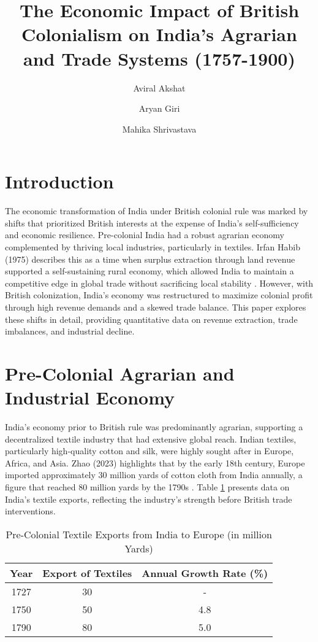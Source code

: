 \documentclass[9pt,twocolumn,twoside]{opticajnl}
\title{The Economic Impact of British Colonialism on India’s Agrarian and Trade Systems (1757-1900)}}
\author[1]{Aviral Akshat}
\author[2,]{Aryan Giri}
\author[3]{Mahika Shrivastava}
\affil[1]{2023MS11098}
\affil[2]{2023MS10602}
\affil[3]{2021ME21069}
\affil[1]{ms1231098@iitd.ac.in}
\affil[2]{ms1230602@iitd.ac.in}
\affil[3]{me2211069@iitd.ac.in}
\begin{document}
\maketitle

\section{Introduction}
The economic transformation of India under British colonial rule was marked by shifts that prioritized British interests at the expense of India’s self-sufficiency and economic resilience. Pre-colonial India had a robust agrarian economy complemented by thriving local industries, particularly in textiles. Irfan Habib (1975) describes this as a time when surplus extraction through land revenue supported a self-sustaining rural economy, which allowed India to maintain a competitive edge in global trade without sacrificing local stability \cite{habib1975colonization}. However, with British colonization, India’s economy was restructured to maximize colonial profit through high revenue demands and a skewed trade balance. This paper explores these shifts in detail, providing quantitative data on revenue extraction, trade imbalances, and industrial decline.

\section{Pre-Colonial Agrarian and Industrial Economy}
India’s economy prior to British rule was predominantly agrarian, supporting a decentralized textile industry that had extensive global reach. Indian textiles, particularly high-quality cotton and silk, were highly sought after in Europe, Africa, and Asia. Zhao (2023) highlights that by the early 18th century, Europe imported approximately 30 million yards of cotton cloth from India annually, a figure that reached 80 million yards by the 1790s \cite{zhao2023colonialism}. Table \ref{table:pre_colonial_exports} presents data on India's textile exports, reflecting the industry’s strength before British trade interventions.

\begin{table}[h!]

\begin{tabular}{|c|c|c|}
\hline
\centering
\textbf{Year} & \textbf{Export of Textiles} & \textbf{Annual Growth Rate (\%)} \\
\hline
1727 & 30 & - \\
1750 & 50 & 4.8 \\
1790 & 80 & 5.0 \\
\hline
\end{tabular}
\caption{Pre-Colonial Textile Exports from India to Europe (in million Yards)}
\label{table:pre_colonial_exports}
\end{table}
\end{document}

